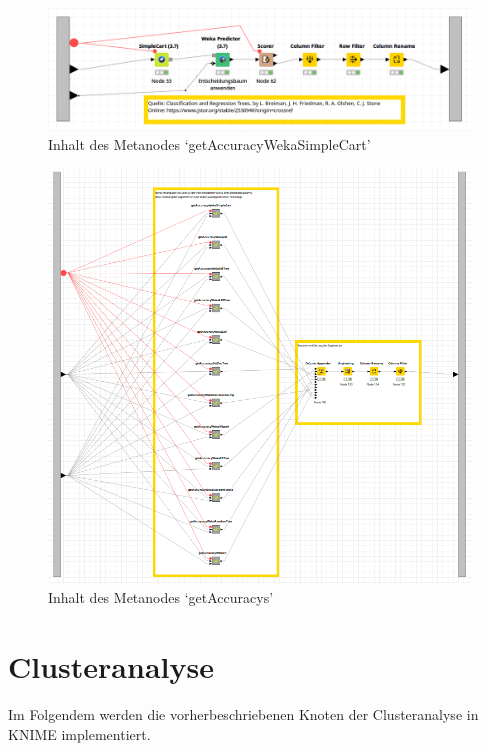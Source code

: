 \documentclass[12pt,					%
							 oneside,			%
							 a4paper,			%
							 halfparskip,		%
							 liststotoc,			%
							 bibtotoc,			%
							 fleqn,				%
							 pointlessnumbers]	%
							 {scrreprt}
\begin{document}
		\begin{figure}[h]
			\begin{center}
				\includegraphics[scale=0.35]{pictures/trees-workflow-weka-example.png}
				\caption{Inhalt des Metanodes `getAccuracyWekaSimpleCart'}									
				\label{figure:trees:workflow:example:weka}
			\end{center}
		\end{figure}
		
		\begin{figure}[h]
			\begin{center}
				\includegraphics[scale=0.45]{pictures/trees-workflow-getAccuracys.png}
				\caption{Inhalt des Metanodes `getAccuracys'}									
				\label{figure:trees:workflow:getaccuracys}
			\end{center}
		\end{figure}
		

	\section{Clusteranalyse}
	Im Folgendem werden die vorherbeschriebenen Knoten der Clusteranalyse in KNIME implementiert.
	
\end{document}
